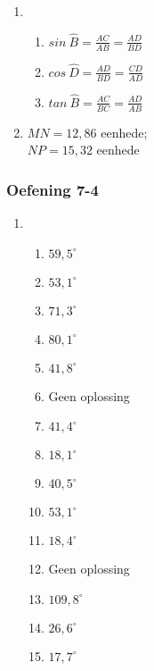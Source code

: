 {\begin{multicols}{3}
\begin{enumerate}[noitemsep, label=\textbf{\arabic*}. ]
\item %

     \begin{enumerate}[itemsep=1pt, label=\textbf{(\alph*)} ]
    \item $sin~\hat{B}=\frac{AC}{AB}=\frac{AD}{BD}$%
    \item $cos~\hat{D}=\frac{AD}{BD}=\frac{CD}{AD}$%
    \item $tan~\hat{B}=\frac{AC}{BC}=\frac{AD}{AB}$%
    \end{enumerate}

\item $MN=12,86$ eenhede; \\$NP=15,32$ eenhede %

\end{enumerate}

\subsubsection*{Oefening 7-4} %
   \begin{enumerate}[noitemsep, label=\textbf{\arabic*}. ] 
\item %
    \begin{enumerate}[noitemsep, label=\textbf{(\alph*)} ]
\item $59,5^{\circ}$%
\item $53,1^{\circ}$%
\item $71,3^{\circ}$%
\item $80,1^{\circ}$%
\item $41,8^{\circ}$%
\item Geen oplossing%
\item $41,4^{\circ}$%
\item $18,1^{\circ}$%
\item $40,5^{\circ}$%
\item $53,1^{\circ}$%
\item $18,4^{\circ}$%
\item Geen oplossing%
\item $109,8^{\circ}$%
\item $26,6^{\circ}$%
\item $17,7^{\circ}$%
\end{enumerate}


\end{enumerate}
\end{multicols}}
